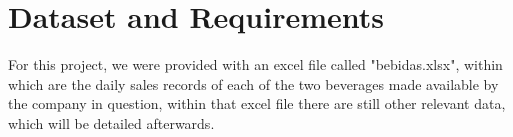 \section{Dataset and Requirements}


\quad For this project, we were provided with an excel file called "bebidas.xlsx", within which are the daily sales records of each of the two beverages made available by the company in question, within that excel file there are still other relevant data, which will be detailed afterwards.



